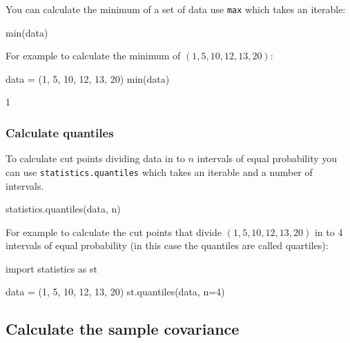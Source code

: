 You can calculate the minimum of a set of data use \texttt{max} which takes an iterable:


\begin{pyin}
min(data)
\end{pyin}



For example to calculate the minimum of \((1, 5, 10, 12, 13, 20)\):




\begin{pyin}
data = (1, 5, 10, 12, 13, 20)
min(data)
\end{pyin}





\begin{raw}
1
\end{raw}





\subsubsection{Calculate quantiles}
\label{\detokenize{tools-for-mathematics/08-statistics/how/main:calculate-quantiles}}

To calculate cut points dividing data in to \(n\) intervals of equal probability
you can use \texttt{statistics.quantiles} which takes an iterable and a number of
intervals.


\begin{pyin}
statistics.quantiles(data, n)
\end{pyin}



For example to calculate the cut points that divide \((1, 5, 10, 12, 13, 20)\) in
to 4 intervals of equal probability (in this case the quantiles are called
quartiles):




\begin{pyin}
import statistics as st

data = (1, 5, 10, 12, 13, 20)
st.quantiles(data, n=4)
\end{pyin}





\begin{raw}
[4.0, 11.0, 14.75]
\end{raw}





\subsection{Calculate the sample covariance}
\label{\detokenize{tools-for-mathematics/08-statistics/how/main:calculate-the-sample-covariance}}

